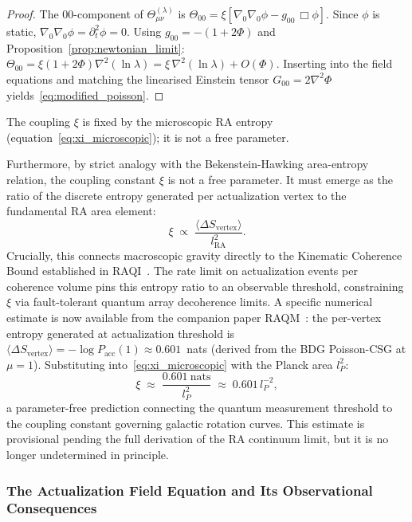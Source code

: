 \documentclass[11pt,a4paper]{article}
\theoremstyle{plain}
\theoremstyle{definition}
\theoremstyle{remark}
\begin{document}
\begin{description}
\begin{proof}
The $00$-component of $\Theta_{\mu\nu}^{(\lambda)}$ is
$\Theta_{00} = \xi[\nabla_0\nabla_0\phi - g_{00}\,\Box\phi]$.
Since $\phi$ is static, $\nabla_0\nabla_0\phi = \partial_t^2\phi = 0$.
Using $g_{00} = -(1+2\Phi)$ and Proposition~\ref{prop:newtonian_limit}:
$\Theta_{00} = \xi(1+2\Phi)\nabla^2(\ln\lambda) = \xi\,\nabla^2(\ln\lambda) + O(\Phi)$.
Inserting into the field equations and matching the linearised Einstein tensor
$G_{00} = 2\nabla^2\Phi$ yields~\eqref{eq:modified_poisson}.
\end{proof}

\noindent
The coupling $\xi$ is fixed by the microscopic RA entropy
(equation~\eqref{eq:xi_microscopic}); it is not a free parameter.

Furthermore, by strict analogy with the Bekenstein-Hawking area-entropy
relation, the coupling constant $\xi$ is not a free parameter. It must emerge
as the ratio of the discrete entropy generated per actualization vertex to the
fundamental RA area element:
\begin{equation}
  \xi \;\propto\; \frac{\langle\Delta S_{\mathrm{vertex}}\rangle}{l_{\mathrm{RA}}^2}.
  \label{eq:xi_microscopic}
\end{equation}
Crucially, this connects macroscopic gravity directly to the Kinematic Coherence
Bound established in RAQI~\citep{Sandeman2026RAQI}. The rate limit on
actualization events per coherence volume pins this entropy ratio to an
observable threshold, constraining $\xi$ via fault-tolerant quantum array
decoherence limits.
A specific numerical estimate is now available from the companion paper
RAQM~\citep{Sandeman2026RAQM}: the per-vertex entropy generated at
actualization threshold is $\langle\Delta S_{\mathrm{vertex}}\rangle
= -\log P_{\mathrm{acc}}(1) \approx 0.601$~nats (derived from the
BDG Poisson-CSG at $\mu=1$). Substituting into~\eqref{eq:xi_microscopic}
with the Planck area $l_P^2$:
\begin{equation}
  \xi \;\approx\; \frac{0.601~\text{nats}}{l_P^2}
  \;\approx\; 0.601\,l_P^{-2},
  \label{eq:xi_numerical}
\end{equation}
a parameter-free prediction connecting the quantum measurement threshold
to the coupling constant governing galactic rotation curves.
This estimate is provisional pending the full derivation of the RA
continuum limit, but it is no longer undetermined in principle.

\subsubsection*{The Actualization Field Equation and Its Observational Consequences}


\end{description}
\end{document}
